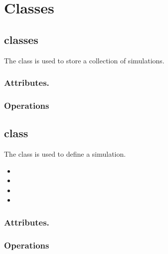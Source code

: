 \chapter{Classes} \label{c:classes}

\section{ classes}

The  class is used to store a collection of simulations.


\subsection{Attributes.}

\subsection{Operations}


\section{ class}

The  class is used to define a simulation.  

\begin{itemize}
\item {}
\item {}
\item {}
\item {}
\end{itemize}

\subsection{Attributes.}

\subsection{Operations}


